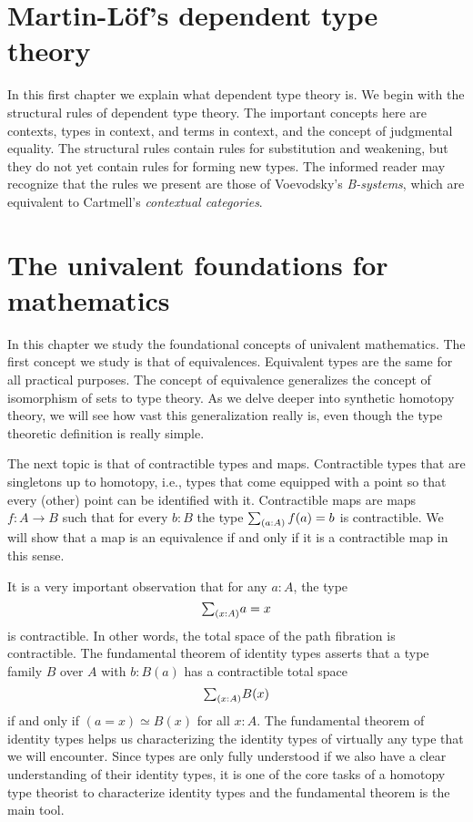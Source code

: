 \documentclass[10pt]{memoir} %
\begin{document}
\mainmatter

\renewcommand{\thechapter}{\Roman{chapter}}

\chapter{Martin-L\"of's dependent type theory}

In this first chapter we explain what dependent type theory is. We begin with the structural rules of dependent type theory. The important concepts here are contexts, types in context, and terms in context, and the concept of judgmental equality. The structural rules contain rules for substitution and weakening, but they do not yet contain rules for forming new types. The informed reader may recognize that the rules we present are those of Voevodsky's \emph{B-systems}, which are equivalent to Cartmell's \emph{contextual categories}.







\chapter{The univalent foundations for mathematics}

In this chapter we study the foundational concepts of univalent mathematics.
The first concept we study is that of equivalences. Equivalent types are the same for all practical purposes. The concept of equivalence generalizes the concept of isomorphism of sets to type theory. As we delve deeper into synthetic homotopy theory, we will see how vast this generalization really is, even though the type theoretic definition is really simple.

The next topic is that of contractible types and maps. Contractible types that are singletons up to homotopy, i.e., types that come equipped with a point so that every (other) point can be identified with it. Contractible maps are maps $f:A\to B$ such that for every $b:B$ the type $\sm{a:A}f(a)=b$ is contractible. We will show that a map is an equivalence if and only if it is a contractible map in this sense.

It is a very important observation that for any $a:A$, the type
\begin{equation*}
  \sm{x:A}a=x  
\end{equation*}
is contractible. In other words, the total space of the path fibration is contractible. The fundamental theorem of identity types asserts that a type family $B$ over $A$ with $b:B(a)$ has a contractible total space
\begin{equation*}
  \sm{x:A}B(x)
\end{equation*}
if and only if $(a=x)\simeq B(x)$ for all $x:A$. The fundamental theorem of identity types helps us characterizing the identity types of virtually any type that we will encounter. Since types are only fully understood if we also have a clear understanding of their identity types, it is one of the core tasks of a homotopy type theorist to characterize identity types and the fundamental theorem is the main tool.
\end{document}
